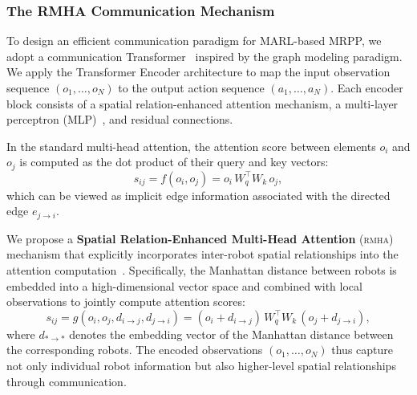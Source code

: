\documentclass[conference]{IEEEtran}
\newcommand{\rmha}{\textsc{rmha}}
\begin{document}
\subsubsection{The RMHA Communication Mechanism}

To design an efficient communication paradigm for MARL-based
MRPP, we adopt a communication
Transformer~\cite{wang2025transformer,xiong2025ropt,lee2024mission}
inspired by the graph modeling paradigm.
We apply the Transformer Encoder architecture to map the input
observation sequence $(o_1,\ldots,o_N)$ to the output action
sequence $(a_1,\ldots,a_N)$.
Each encoder block consists of a spatial relation-enhanced
attention mechanism, a multi-layer perceptron
(MLP)~\cite{aina2025mlp,wang2025mlp,ouaret2025mlp}, and residual
connections.

In the standard multi-head attention, the attention score between
elements $o_i$ and $o_j$ is computed as the dot product of their
query and key vectors:
\begin{equation}\label{eq:vanilla_attn}
  s_{ij} = f(o_i, o_j) = o_i\, W_q^\top W_k\, o_j,
\end{equation}
which can be viewed as implicit edge information associated with
the directed edge $e_{j\to i}$.

We propose a \textbf{Spatial Relation-Enhanced Multi-Head
Attention} (\rmha) mechanism that explicitly incorporates
inter-robot spatial relationships into the attention
computation~\cite{xiao2025collaborative,chen2025predicting,chen2023transportation}.
Specifically, the Manhattan distance between robots is embedded
into a high-dimensional vector space and combined with local
observations to jointly compute attention scores:
\begin{equation}\label{eq:rmha_attn}
  s_{ij} = g(o_i, o_j, d_{i\to j}, d_{j\to i})
         = (o_i + d_{i\to j})\, W_q^\top W_k\, (o_j + d_{j\to i}),
\end{equation}
where $d_{*\to *}$ denotes the embedding vector of the Manhattan
distance between the corresponding robots.
The encoded observations $(o_1,\ldots,o_N)$ thus capture not only
individual robot information but also higher-level spatial
relationships through communication.
\end{document}
